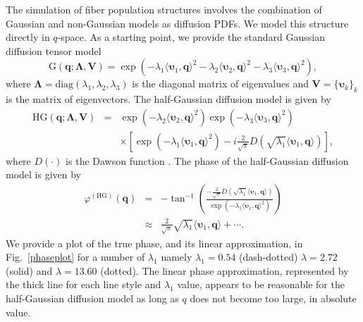 \documentclass[authoryear,preprint,12pt]{elsarticle}
\newcommand{\q}{\mathbf{q}}
\newcommand{\bsL}{\bs{\Lambda}}
\newcommand{\bsu}{\bs{\upsilon}}
\newcommand{\bld}[1]{\mathbf{#1}}
\newcommand{\bs}[1]{\boldsymbol{#1}}
\begin{document}
The simulation of fiber population structures involves the combination
of Gaussian and non-Gaussian models as diffusion PDFs.  We model this
structure directly in $q$-space.  As a starting point, we provide the
standard Gaussian diffusion tensor model
\begin{equation}\label{GaussianDTI}
  \text{G}(\q;\bsL,\bld{V}) = \exp\left(-\lambda_1\langle\bsu_1,
  \q\rangle^2-\lambda_2 \langle\bsu_2,
  \q\rangle^2-\lambda_3\langle\bsu_3, \q\rangle^2\right),
\end{equation} 
where $\bsL=\text{diag}(\lambda_1,\lambda_2,\lambda_3)$ is the
diagonal matrix of eigenvalues and $\bld{V}=\{\bsu_k\}_k$ is the
matrix of eigenvectors.  The half-Gaussian diffusion model is given by
\begin{eqnarray}
  \nonumber
  \text{HG}(\q;\bsL,\bld{V}) &=&
  \exp\left(-\lambda_2\langle\bsu_2,\q\rangle^2\right)
  \exp\left(-\lambda_3\langle\bsu_3,\q\rangle^2\right)\\
  & & \times\left[\exp\left(-\lambda_1\langle\bsu_1,\q\rangle^2\right)
  - i \frac{2}{\sqrt{\pi}} D\left(\sqrt{\lambda_1}\langle \bsu_1, \q
  \rangle\right)\right],
  \label{Dawson}
\end{eqnarray}
where $D(\cdot)$ is the Dawson function \citep{abra}.  The phase of
the half-Gaussian diffusion model is given by
\begin{eqnarray}\label{angle:halfG}
  \varphi^{(\text{HG})}(\q) &=& -\tan^{-1}
  \left(\frac{-\frac{2}{\sqrt{\pi}} D\left(\sqrt{\lambda_1}
  \langle\bsu_1, \q \rangle\right)} {\exp\left(-\lambda_1\langle\bsu_1, \q\rangle^2\right)}\right)\\
  &\approx & \frac{2}{\sqrt{\pi}}\sqrt{\lambda_1}\langle \bsu_1, \q
  \rangle + \cdots.
\end{eqnarray}
We provide a plot of the true phase, and its linear approximation, in
Fig.~\ref{phaseplot} for a number of $\lambda_1$ namely
$\lambda_1=0.54$ (dash-dotted) $\lambda=2.72$ (solid) and
$\lambda=13.60$ (dotted).  The linear phase approximation, represented
by the thick line for each line style and $\lambda_1$ value, appears
to be reasonable for the half-Gaussian diffusion model as long as $q$
does not become too large, in absolute value.
\end{document}
